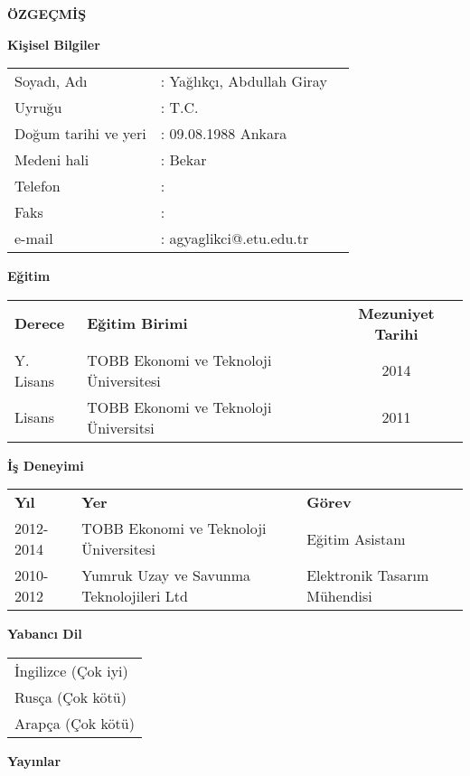 \newpage
\pagestyle{plain}
\begin{center}
{\LARGE \bf \"OZGE\c{C}M\.{I}\c{S}}
\end{center}
\vspace{0.5cm}
{\bf Ki\c{s}isel Bilgiler}


\noindent
\begin{tabular}{@{}lll@{}}
Soyad{\i}, Ad{\i} & : Yağlıkçı, Abdullah Giray &\\
Uyru\u{g}u & : T.C.&\\
Do\u{g}um tarihi ve yeri & : 09.08.1988 Ankara&\\
Medeni hali & : Bekar& \\
Telefon & : &\\
Faks & : &\\
e-mail & : agyaglikci@.etu.edu.tr &\\
\end{tabular}

\vspace{0.5cm}
\noindent
{\bf E\u{g}itim}


\noindent
\begin{tabular}{@{}llc@{}}
{\bf Derece} & {\bf E\u{g}itim Birimi} & {\bf Mezuniyet Tarihi}\\
Y. Lisans & TOBB Ekonomi ve Teknoloji \"Universitesi & 2014\\
Lisans & TOBB Ekonomi ve Teknoloji \"Universitsi& 2011\\
\end{tabular}

\vspace{0.5cm}
\noindent
{\bf \.{I}\c{s} Deneyimi}


\noindent
\begin{tabular}{@{}lll@{}}
{\bf Y{\i}l} & {\bf Yer} & {\bf G\"orev}\\
2012-2014 & TOBB Ekonomi ve Teknoloji \"Universitesi & Eğitim Asistanı\\
2010-2012 & Yumruk Uzay ve Savunma Teknolojileri Ltd & Elektronik Tasarım Mühendisi\\
\end{tabular}

\vspace{0.5cm}
\noindent
{\bf Yabanc{\i} Dil}


\noindent
\begin{tabular}{@{}l@{}}
\.{I}ngilizce (\c{C}ok iyi)\\
Rusça (\c{C}ok k\"ot\"u)\\
Arapça (\c{C}ok k\"ot\"u)\\
\end{tabular}


\vspace{0.5cm}
\noindent
{\bf Yay{\i}nlar}


\noindent

